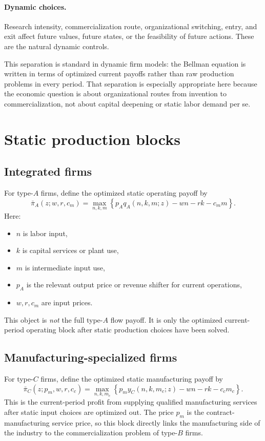 \documentclass[12pt]{article}
\begin{document}
\paragraph{Dynamic choices.}
Research intensity, commercialization route, organizational switching, entry, and exit affect
future values, future states, or the feasibility of future actions. These are the natural
dynamic controls.

This separation is standard in dynamic firm models: the Bellman equation is written in
terms of optimized current payoffs rather than raw production problems in every period.
That separation is especially appropriate here because the economic question is about
organizational routes from invention to commercialization, not about capital deepening
or static labor demand per se.

\section{Static production blocks}

\subsection{Integrated firms}

For type-$A$ firms, define the optimized static operating payoff by
\[
\bar{\pi}_A(z;w,r,c_m)
=
\max_{n,k,m}
\left\{
p_A q_A(n,k,m;z)-wn-rk-c_m m
\right\}.
\]
Here:
\begin{itemize}[leftmargin=2em]
    \item $n$ is labor input,
    \item $k$ is capital services or plant use,
    \item $m$ is intermediate input use,
    \item $p_A$ is the relevant output price or revenue shifter for current operations,
    \item $w,r,c_m$ are input prices.
\end{itemize}
This object is \emph{not} the full type-$A$ flow payoff. It is only the optimized
current-period operating block after static production choices have been solved.

\subsection{Manufacturing-specialized firms}

For type-$C$ firms, define the optimized static manufacturing payoff by
\[
\bar{\pi}_C(z;p_m,w,r,c_c)
=
\max_{n,k,m_c}
\left\{
p_m y_C(n,k,m_c;z)-wn-rk-c_c m_c
\right\}.
\]
This is the current-period profit from supplying qualified manufacturing services
after static input choices are optimized out. The price $p_m$ is the contract-manufacturing
service price, so this block directly links the manufacturing side of the industry
to the commercialization problem of type-$B$ firms.
\end{document}
